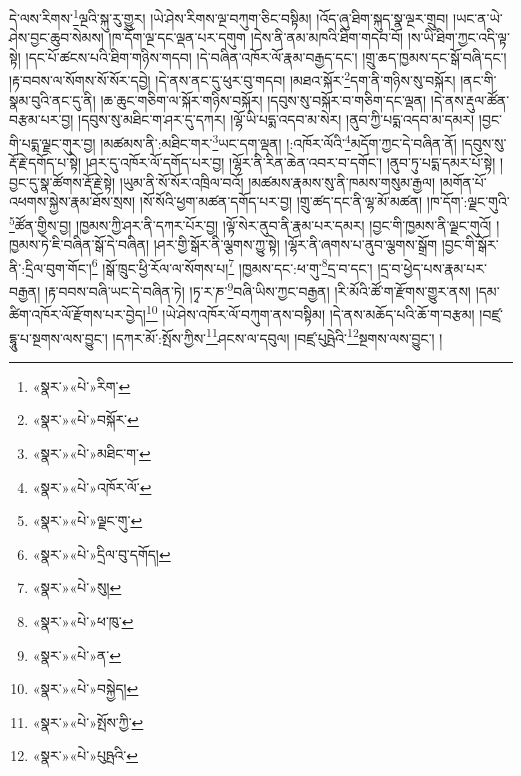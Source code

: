 དེ་ལས་རིགས་\footnote{«སྣར་»«པེ་»རིག་}ལྔའི་སྐུ་རུ་གྱུར། །ཡེ་ཤེས་རིགས་ལྔ་བཀུག་ཅིང་བསྟིམ། །འོད་ཞུ་ཐིག་སྐུད་སྣ་ལྔར་གྲུབ། །ཡང་ན་ཡེ་ཤེས་བྱང་ཆུབ་སེམས། །ཁ་དོག་ལྔ་དང་ལྡན་པར་དགུག །དེས་ནི་ནམ་མཁའི་ཐིག་གདབ་བོ། །ས་ཡི་ཐིག་ཀྱང་འདི་ལྟ་སྟེ། །དང་པོ་ཚངས་པའི་ཐིག་གཉིས་གདབ། །དེ་བཞིན་འཁོར་ལོ་རྣམ་བརྒྱད་དང་། །གྲུ་ཆད་ཁྱམས་དང་སྒོ་བཞི་དང་། །རྟ་བབས་ལ་སོགས་སོ་སོར་དབྱེ། །དེ་ནས་ནང་དུ་ཕུར་བུ་གདབ། །མཐའ་སྐོར་\footnote{«སྣར་»«པེ་»བསྐོར་}དག་ནི་གཉིས་སུ་བསྐོར། །ནང་གི་སྣམ་བུའི་ནང་དུ་ནི། །ཆ་ཆུང་གཅིག་ལ་སྐོར་གཉིས་བསྐོར། །དབུས་སུ་བསྐོར་བ་གཅིག་དང་ལྡན། །དེ་ནས་རྡུལ་ཚོན་བརྩམ་པར་བྱ། །དབུས་སུ་མཐིང་ག་ཤར་དུ་དཀར། །ལྷོ་ཡི་པདྨ་འདབ་མ་སེར། །ནུབ་ཀྱི་པདྨ་འདབ་མ་དམར། །བྱང་གི་པདྨ་ལྗང་གུར་བྱ། །མཚམས་ནི་:མཐིང་གར་\footnote{«སྣར་»«པེ་»མཐིང་ག་}ཡང་དག་ལྡན། །:འཁོར་ལོའི་\footnote{«སྣར་»«པེ་»འཁོར་ལོ་}མདོག་ཀྱང་དེ་བཞིན་ནོ། །དབུས་སུ་རྡོ་རྗེ་དགོད་པ་སྟེ། །ཤར་དུ་འཁོར་ལོ་དགོད་པར་བྱ། །ལྷོར་ནི་རིན་ཆེན་འབར་བ་དགོང་། །ནུབ་ཏུ་པདྨ་དམར་པོ་སྟེ། །བྱང་དུ་སྣ་ཚོགས་རྡོ་རྗེ་སྟེ། །ཡུམ་ནི་སོ་སོར་འཁྲིལ་བའོ། །མཚམས་རྣམས་སུ་ནི་ཁམས་གསུམ་རྒྱལ། །མགོན་པོ་འཕགས་སྐྱེས་རྣམ་ཐོས་སྲས། །སོ་སོའི་ཕྱག་མཚན་དགོད་པར་བྱ། །གྲུ་ཚད་དང་ནི་ལྷ་མོ་མཚན། །ཁ་དོག་:ལྗང་གུའི་\footnote{«སྣར་»«པེ་»ལྗང་གུ་}ཚོན་གྱིས་བྱ། །ཁྱམས་ཀྱི་ཤར་ནི་དཀར་པོར་བྱ། །ལྟོ་སེར་ནུབ་ནི་རྣམ་པར་དམར། །བྱང་གི་ཁྱམས་ནི་ལྗང་གུའོ། །ཁྱམས་ཏེ་ཇི་བཞིན་སྒོ་དེ་བཞིན། །ཤར་གྱི་སྒོར་ནི་ལྕགས་ཀྱུ་སྟེ། །ལྷོར་ནི་ཞགས་པ་ནུབ་ལྕགས་སྒྲོག །བྱང་གི་སྒོར་ནི་:དྲིལ་བུག་གོང་།\footnote{«སྣར་»«པེ་»དྲིལ་བུ་དགོད།} །སྒོ་ཁྲུང་ཕྱི་རོལ་ལ་སོགས་པ།\footnote{«སྣར་»«པེ་»སུ།} །ཁྱམས་དང་:ཕ་གུ་\footnote{«སྣར་»«པེ་»ཕ་ཁུ་}དྲ་བ་དང་། །དྲ་བ་ཕྱེད་པས་རྣམ་པར་བརྒྱན། །རྟ་བབས་བཞི་ཡང་དེ་བཞིན་ཏེ། །ཏྭ་ར་ཎ་\footnote{«སྣར་»«པེ་»ན་}བཞི་ཡིས་ཀྱང་བརྒྱན། །རི་མོའི་ཚོ་ག་རྫོགས་གྱུར་ནས། །དམ་ཚིག་འཁོར་ལོ་རྫོགས་པར་བྱེད།\footnote{«སྣར་»«པེ་»བསྐྱེད།} །ཡེ་ཤེས་འཁོར་ལོ་བཀུག་ནས་བསྟིམ། །དེ་ནས་མཆོད་པའི་ཆོ་ག་བརྩམ། །བཛྲ་དྷཱུ་པ་སྔགས་ལས་བྱུང་། །དཀར་མོ་:སྤོས་ཀྱིས་\footnote{«སྣར་»«པེ་»སྤོས་ཀྱི་}ཤངས་ལ་དབུལ། །བཛྲ་པུཥྤེའི་\footnote{«སྣར་»«པེ་»པུཥྤའི་}སྔགས་ལས་བྱུང་། །
